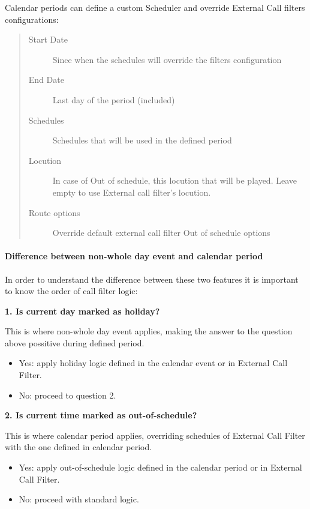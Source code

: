 \documentclass[letterpaper,10pt,spanish]{sphinxmanual}
\begin{document}
Calendar periods can define a custom Scheduler and override External Call filters configurations:
\begin{quote}
\begin{description}
\item[{Start Date}] \leavevmode
Since when the schedules will override the filters configuration

\item[{End Date}] \leavevmode
Last day of the period (included)

\item[{Schedules}] \leavevmode
Schedules that will be used in the defined period

\item[{Locution}] \leavevmode
In case of Out of schedule, this locution that will be played. Leave empty to use External
call filter's locution.

\item[{Route options}] \leavevmode
Override default external call filter Out of schedule options

\end{description}
\end{quote}


\paragraph{Difference between non-whole day event and calendar period}
\label{administration_portal/client/vpbx/routing_tools/calendars:difference-between-non-whole-day-event-and-calendar-period}
In order to understand the difference between these two features it is important to know the order of call filter logic:

\textbf{1. Is current day marked as holiday?}

This is where non-whole day event applies, making the answer to the question above possitive during defined period.
\begin{itemize}
\item {} 
Yes: apply holiday logic defined in the calendar event or in External Call Filter.

\item {} 
No: proceed to question 2.

\end{itemize}

\textbf{2. Is current time marked as out-of-schedule?}

This is where calendar period applies, overriding schedules of External Call Filter with the one defined in calendar
period.
\begin{itemize}
\item {} 
Yes: apply out-of-schedule logic defined in the calendar period or in External Call Filter.

\item {} 
No: proceed with standard logic.

\end{itemize}
\end{document}

